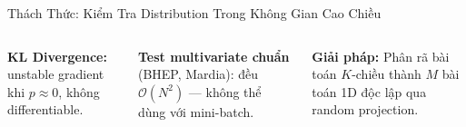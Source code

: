 \documentclass[aspectratio=169,9pt]{beamer}
\begin{document}
\begin{frame}{Thách Thức: Kiểm Tra Distribution Trong Không Gian Cao Chiều}
\begin{columns}[T]
\vspace{0.4em}
\begin{badbox}
\footnotesize \textbf{KL Divergence:} unstable gradient khi $p\approx 0$, không differentiable.
\end{badbox}

\vspace{0.4em}
\begin{badbox}
\footnotesize \textbf{Test multivariate chuẩn} (BHEP, Mardia): đều $\mathcal{O}(N^2)$ — không thể dùng với mini-batch.
\end{badbox}

\vspace{0.5em}
\begin{accentbox}
\footnotesize \textbf{Giải pháp:} Phân rã bài toán $K$-chiều thành $M$ bài toán 1D độc lập qua random projection.
\end{accentbox}

\end{columns}

\end{frame}
\end{document}
